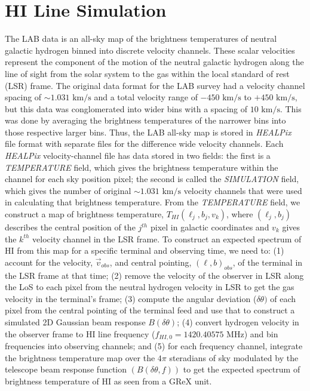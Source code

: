 \section{HI Line Simulation}\label{sec:Asimulation}
The LAB data is an all-sky map of the brightness temperatures of neutral galactic hydrogen binned into discrete velocity channels. 
These scalar velocities represent the component of the motion of the neutral galactic hydrogen along the line of sight from the solar system to the gas within the local standard of rest (LSR) frame.
The original data format for the LAB survey had a velocity channel spacing of $\sim 1.031\text{ km/s}$ and a total velocity range of $-450\text{ km/s}$ to $+450\text{ km/s}$, but this data was conglomerated into wider bins with a spacing of $10\text{ km/s}$. 
This was done by averaging the brightness temperatures of the narrower bins into those respective larger bins.
Thus, the LAB all-sky map is stored in \textit{HEALPix}~\cite{gorskiHEALPixFrameworkHighResolution2005} file format with separate files for the difference wide velocity channels. 
Each \textit{HEALPix} velocity-channel file has data stored in two fields: the first is a \textit{TEMPERATURE} field, which gives the brightness temperature within the channel for each sky position pixel; the second is called the \textit{SIMULATION} field, which gives the number of original $\sim 1.031\text{ km/s}$ velocity channels that were used in calculating that brightness temperature. 
From the \textit{TEMPERATURE} field, we construct a map of brightness temperature, $T_{HI}(\ell_j, b_j,v_k)$, where $(\ell_j, b_j)$ describes the central position of the $j^{th}$ pixel in galactic coordinates and $v_k$ gives the $k^{th}$ velocity channel in the LSR frame. 
To construct an expected spectrum of HI from this map for a specific terminal and observing time, we need to: (1) account for the velocity, $\vec{v}_{obs}$, and central pointing, $(\ell,b)_{obs}$, of the terminal in the LSR frame at that time; (2) remove the velocity of the observer in LSR along the LoS to each pixel from the neutral hydrogen velocity in LSR to get the gas velocity in the terminal's frame; (3) compute the angular deviation ($\delta\theta)$ of each pixel from the central pointing of the terminal feed and use that to construct a simulated 2D Gaussian beam response $B(\delta\theta)$; (4) convert hydrogen velocity in the observer frame to HI line frequency ($f_{HI,0}=1420.40575\text{ MHz}$) and bin frequencies into observing channels; and (5) for each frequency channel, integrate the brightness temperature map over the $4\pi$ steradians of sky modulated by the telescope beam response function $(B(\delta\theta,f))$ to get the expected spectrum of brightness temperature of HI as seen from a GReX unit.

